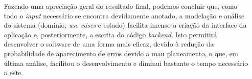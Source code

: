 Fazendo uma apreciação geral do resultado final, podemos concluir que, como todo o \textit{input} necessário se encontra devidamente anotado, a modelação e análise do sistema (domínio, \textit{use cases} e estado) facilita imenso a criação da interface da aplicação e, posteriormente, a escrita do código \textit{backend}. Isto permitirá desenvolver o software de uma forma mais eficaz, devido à redução da probabilidade de aparecimento de erros devido a mau planeamento, o que, em última análise, facilitou o desenvolvimento e diminui bastante o tempo necessário a este.